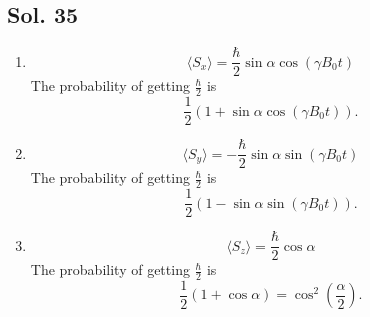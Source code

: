        \subsection*{Sol. 35}
       \begin{enumerate}
           \item 
           $$
           \langle S_x\rangle
           =\frac{\hbar}{2}
           \sin\alpha
           \cos(\gamma B_0t)
           $$
           The probability of getting 
           $\frac{\hbar}{2}$ is 
           $$
           \frac{1}{2}
           (
           1 + \sin\alpha\cos(\gamma B_0t)
           ).
           $$
           \item 
           $$
           \langle S_y\rangle
           =-\frac{\hbar}{2}
           \sin\alpha
           \sin(\gamma B_0t)
           $$
           The probability of getting 
           $\frac{\hbar}{2}$ is 
           $$
           \frac{1}{2}
           (
           1 - \sin\alpha\sin(\gamma B_0t)
           ).
           $$
           \item 
           $$
           \langle S_z\rangle
           =\frac{\hbar}{2}
           \cos\alpha
           $$
           The probability of getting 
           $\frac{\hbar}{2}$ is 
           $$
           \frac{1}{2}
           (
           1 + \cos\alpha
           )=\cos^2\left(\frac{\alpha}{2}\right).
           $$
       \end{enumerate}

